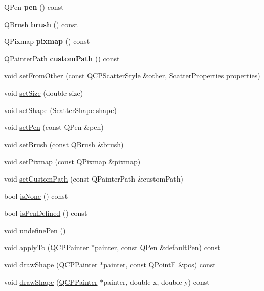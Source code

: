 \begin{DoxyCompactItemize}
Q\+Pen {\bfseries pen} () const
\item 
\mbox{\label{class_q_c_p_scatter_style_adc4f66aed84f1d7a3a5aabf4f48f31a6}} 
Q\+Brush {\bfseries brush} () const
\item 
\mbox{\label{class_q_c_p_scatter_style_a9b2d1a2ec0aac0c74f7582d14050e93a}} 
Q\+Pixmap {\bfseries pixmap} () const
\item 
\mbox{\label{class_q_c_p_scatter_style_aef1fac84c9830fd97f2a8568e605e372}} 
Q\+Painter\+Path {\bfseries custom\+Path} () const
\item 
void \hyperlink{class_q_c_p_scatter_style_a7d59ba8864914f765817841089e436f1}{set\+From\+Other} (const \hyperlink{class_q_c_p_scatter_style}{Q\+C\+P\+Scatter\+Style} \&other, Scatter\+Properties properties)
\item 
void \hyperlink{class_q_c_p_scatter_style_aaefdd031052892c4136129db68596e0f}{set\+Size} (double size)
\item 
void \hyperlink{class_q_c_p_scatter_style_a7c641c4d4c6d29cb705d3887cfce91c1}{set\+Shape} (\hyperlink{class_q_c_p_scatter_style_adb31525af6b680e6f1b7472e43859349}{Scatter\+Shape} shape)
\item 
void \hyperlink{class_q_c_p_scatter_style_a761f1f229cc0ca4703e1e2b89f6dd1ba}{set\+Pen} (const Q\+Pen \&pen)
\item 
void \hyperlink{class_q_c_p_scatter_style_a74d692aaeb8d4b36d6f7d510e44264b1}{set\+Brush} (const Q\+Brush \&brush)
\item 
void \hyperlink{class_q_c_p_scatter_style_a5fb611d46acfac520d7b89a1c71d9246}{set\+Pixmap} (const Q\+Pixmap \&pixmap)
\item 
void \hyperlink{class_q_c_p_scatter_style_a96a3e949f90b2afe5677ca9412a12a1e}{set\+Custom\+Path} (const Q\+Painter\+Path \&custom\+Path)
\item 
bool \hyperlink{class_q_c_p_scatter_style_a72db6bcb1e1abd6e53c1315dd3dea7e4}{is\+None} () const
\item 
bool \hyperlink{class_q_c_p_scatter_style_a47077eb6450fe9a788f833e4ec1b1d5a}{is\+Pen\+Defined} () const
\item 
void \hyperlink{class_q_c_p_scatter_style_acabc2a8c83d650b946f50c3166b6c35e}{undefine\+Pen} ()
\item 
void \hyperlink{class_q_c_p_scatter_style_afd8044ece445300499ca0dc164821e0f}{apply\+To} (\hyperlink{class_q_c_p_painter}{Q\+C\+P\+Painter} $\ast$painter, const Q\+Pen \&default\+Pen) const
\item 
void \hyperlink{class_q_c_p_scatter_style_a89b5105e6027bfcbfeefed9d201b607c}{draw\+Shape} (\hyperlink{class_q_c_p_painter}{Q\+C\+P\+Painter} $\ast$painter, const Q\+PointF \&pos) const
\item 
void \hyperlink{class_q_c_p_scatter_style_a95c297b114c77c22428ef40f54620ddf}{draw\+Shape} (\hyperlink{class_q_c_p_painter}{Q\+C\+P\+Painter} $\ast$painter, double x, double y) const
\end{DoxyCompactItemize}
